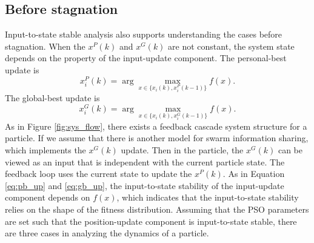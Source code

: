 \documentclass{sig-alternate}
\begin{document}
\subsection{Before stagnation}

Input-to-state stable analysis also supports understanding the cases before stagnation.
When the $ x^{P}(k) $ and $ x^{G}(k) $ are not constant, the system state depends on the property of the input-update component.
The personal-best update is
\begin{equation}
\label{eq:pb_up}
x_{i}^{P}(k) = \arg \max_{ x \in \{ x_{i}(k), x_{i}^{P}(k-1) \} } f(x).
\end{equation}
The global-best update is
\begin{equation}
\label{eq:gb_up}
x_{i}^{G}(k) = \arg \max_{ x \in \{ x_{i}(k), x_{i}^{G}(k-1) \} } f(x).
\end{equation}
As in Figure \ref{fig:sys_flow}, there exists a feedback cascade system structure for a particle.
If we assume that there is another model for swarm information sharing, which implements the $ x^{G}(k) $ update.
Then in the particle, the $ x^{G}(k) $ can be viewed as an input that is independent with the current particle state.
The feedback loop uses the current state to update the $ x^{P}(k) $.
As in Equation \eqref{eq:pb_up} and \eqref{eq:gb_up}, the input-to-state stability of the input-update component depends on $ f(x) $, which indicates that the input-to-state stability relies on the shape of the fitness distribution.
Assuming that the PSO parameters are set such that the position-update component is input-to-state stable, there are three cases in analyzing the dynamics of a particle.
\end{document}
